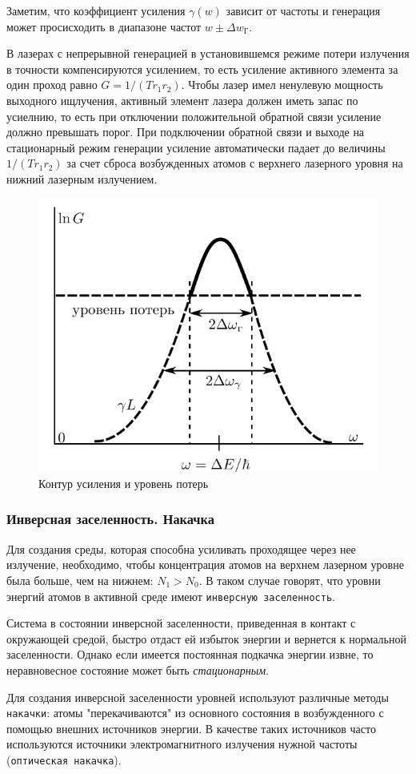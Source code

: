 \documentclass[a4paper,12pt]{article}
\begin{document}
Заметим, что коэффициент усиления $\gamma(w)$ зависит от частоты и генерация может просисходить в диапазоне частот $w\pm\Delta w_\text{Г}$.

В лазерах с непрерывной генерацией в установившемся режиме потери излучения в точности компенсируются усилением, то есть усиление активного элемента за один проход равно $G=1/(Tr_1r_2)$. Чтобы лазер имел ненулевую мощность выходного ищлучения, активный элемент лазера должен иметь запас по усиелнию, то есть при отключении положительной обратной связи усиление должно превышать порог. При подключении обратной связи и выходе на стационарный режим генерации усиление автоматически падает до величины $1/(Tr_1r_2)$ за счет сброса возбужденных атомов с верхнего лазерного уровня на нижний лазерным излучением.

\begin{figure}[h]
\centering
\includegraphics[width=0.5\linewidth]{img7.png}
\caption{Контур усиления и уровень потерь}
\label{img7}
\end{figure}

\subsubsection{Инверсная заселенность. Накачка}

Для создания среды, которая способна усиливать проходящее через нее излучение, необходимо, чтобы концентрация атомов на верхнем лазерном уровне была больше, чем на нижнем: $N_1>N_0$. В таком случае говорят, что уровни энергий атомов в активной среде имеют \texttt{инверсную заселенность}.

Система в состоянии инверсной заселенности, приведенная в контакт с окружающей средой, быстро отдаст ей избыток энергии и вернется к нормальной заселенности. Однако если имеется постоянная подкачка энергии извне, то неравновесное состояние может быть \textit{стационарным}.

Для создания инверсной заселенности уровней используют различные методы \texttt{накачки}: атомы "перекачиваются" из основного состояния в возбужденного с помощью внешних источников энергии. В качестве таких источников часто используются источники электромагнитного излучения нужной частоты (\texttt{оптическая накачка}). 
\end{document}
